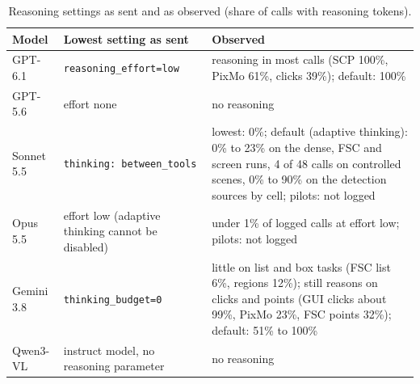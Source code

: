 \begin{table}[h]
\centering\small
\caption{Reasoning settings as sent and as observed (share of calls with reasoning tokens).}\label{tab:settings}
\begin{tabular}{@{}l>{\raggedright\arraybackslash}p{3.8cm}>{\raggedright\arraybackslash}p{8.0cm}@{}}\toprule
Model & Lowest setting as sent & Observed \\\midrule
GPT-6.1 & \texttt{reasoning\_effort=low} & reasoning in most calls (SCP 100\%, PixMo 61\%, clicks 39\%); default: 100\% \\
GPT-5.6 & effort none & no reasoning \\
Sonnet 5.5 & \texttt{thinking: between\_tools} & lowest: 0\%; default (adaptive thinking): 0\% to 23\% on the dense, FSC and screen runs, 4 of 48 calls on controlled scenes, 0\% to 90\% on the detection sources by cell; pilots: not logged \\
Opus 5.5 & effort low (adaptive thinking cannot be disabled) & under 1\% of logged calls at effort low; pilots: not logged \\
Gemini 3.8 & \texttt{thinking\_budget=0} & little on list and box tasks (FSC list 6\%, regions 12\%); still reasons on clicks and points (GUI clicks about 99\%, PixMo 23\%, FSC points 32\%); default: 51\% to 100\% \\
Qwen3-VL & instruct model, no reasoning parameter & no reasoning \\\bottomrule
\end{tabular}
\end{table}
